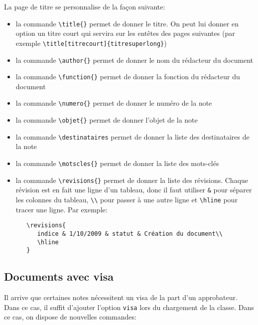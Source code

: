 \documentclass[french]{supaero-note}
\begin{document}
La page de titre se personnalise de la façon suivante:

\begin{itemize}
\item la commande \verb!\title{}! permet de donner le titre. On peut
  lui donner en option un titre court qui servira sur les entêtes des
  pages suivantes (par exemple
  \verb!\title[titrecourt]{titresuperlong}!)
\item la commande \verb!\author{}! permet de donner le nom du
  rédacteur du document
\item la commande \verb!\function{}! permet de donner la fonction du
  rédacteur du document
\item la commande \verb!\numero{}! permet de donner le numéro de la
  note
\item la commande \verb!\objet{}! permet de donner l'objet de la note
\item la commande \verb!\destinataires! permet de donner la liste des
  destinataires de la note
\item la commande \verb!\motscles{}! permet de donner la liste des
  mots-clés
\item la commande \verb!\revisions{}! permet de donner la liste des
  révisions. Chaque révision est en fait une ligne d'un tableau, donc
  il faut utiliser \verb!&! pour séparer les colonnes du tableau,
  \verb!\\! pour passer à une autre ligne et \verb!\hline! pour tracer
  une ligne. Par exemple:

\begin{verbatim}
   \revisions{
      indice & 1/10/2009 & statut & Création du document\\
      \hline
   } 
\end{verbatim}
\end{itemize}

\subsection{Documents avec visa}
\label{sec:documents-avec-visa}

Il arrive que certaines notes nécessitent un visa de la part d'un
approbateur. Dans ce cas, il suffit d'ajouter l'option \verb!visa!
lors du chargement de la classe. Dans ce cas, on dispose de nouvelles
commandes:
\end{document}
